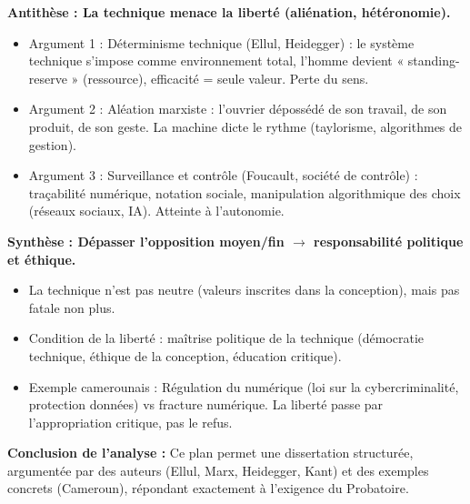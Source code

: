 \documentclass[11pt]{article}
\newcommand{\cle}[1]{{\popxbold\color{popdark}#1}}
\begin{document}
\begin{exoresolu}
\textbf{Antithèse : La technique menace la liberté (aliénation, hétéronomie).}
\begin{itemize}
    \item Argument 1 : Déterminisme technique (Ellul, Heidegger) : le système technique s'impose comme environnement total, l'homme devient « standing-reserve » (ressource), efficacité = seule valeur. Perte du sens.
    \item Argument 2 : Aléation marxiste : l'ouvrier dépossédé de son travail, de son produit, de son geste. La machine dicte le rythme (taylorisme, algorithmes de gestion).
    \item Argument 3 : Surveillance et contrôle (Foucault, société de contrôle) : traçabilité numérique, notation sociale, manipulation algorithmique des choix (réseaux sociaux, IA). Atteinte à l'autonomie.
\end{itemize}

\textbf{Synthèse : Dépasser l'opposition moyen/fin $\rightarrow$ responsabilité politique et éthique.}
\begin{itemize}
    \item La technique n'est pas neutre (valeurs inscrites dans la conception), mais pas fatale non plus.
    \item Condition de la liberté : \cle{maîtrise politique} de la technique (démocratie technique, éthique de la conception, éducation critique).
    \item Exemple camerounais : Régulation du numérique (loi sur la cybercriminalité, protection données) vs fracture numérique. La liberté passe par l'appropriation critique, pas le refus.
\end{itemize}

\textbf{Conclusion de l'analyse :} Ce plan permet une dissertation structurée, argumentée par des auteurs (Ellul, Marx, Heidegger, Kant) et des exemples concrets (Cameroun), répondant exactement à l'exigence du Probatoire.
\end{exoresolu}
\end{document}
